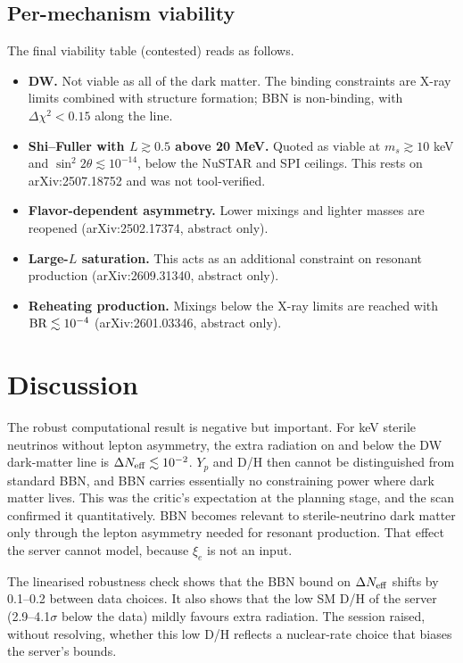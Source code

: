 \documentclass[11pt,a4paper]{article}
\begin{document}
\subsection{Per-mechanism viability}
The final viability table (contested) reads as follows.
\begin{itemize}
\item \textbf{DW.} Not viable as all of the dark matter. The binding constraints are X-ray limits combined with structure formation; BBN is non-binding, with $\Delta\chi^2<0.15$ along the line.
\item \textbf{Shi--Fuller with $L\gtrsim0.5$ above 20 MeV.} Quoted as viable at $m_s\gtrsim10$ keV and $\sin^2 2\theta\lesssim10^{-14}$, below the NuSTAR and SPI ceilings. This rests on arXiv:2507.18752 and was not tool-verified.
\item \textbf{Flavor-dependent asymmetry.} Lower mixings and lighter masses are reopened (arXiv:2502.17374, abstract only).
\item \textbf{Large-$L$ saturation.} This acts as an additional constraint on resonant production (arXiv:2609.31340, abstract only).
\item \textbf{Reheating production.} Mixings below the X-ray limits are reached with ${\rm BR}\lesssim10^{-4}$ (arXiv:2601.03346, abstract only).
\end{itemize}

\section{Discussion}
The robust computational result is negative but important. For keV sterile neutrinos without lepton asymmetry, the extra radiation on and below the DW dark-matter line is $\Delta N_{\rm eff}\lesssim10^{-2}$. $Y_p$ and D/H then cannot be distinguished from standard BBN, and BBN carries essentially no constraining power where dark matter lives. This was the critic's expectation at the planning stage, and the scan confirmed it quantitatively. BBN becomes relevant to sterile-neutrino dark matter only through the lepton asymmetry needed for resonant production. That effect the server cannot model, because $\xi_e$ is not an input.

The linearised robustness check shows that the BBN bound on $\Delta N_{\rm eff}$ shifts by 0.1--0.2 between data choices. It also shows that the low SM D/H of the server (2.9--4.1$\sigma$ below the data) mildly favours extra radiation. The session raised, without resolving, whether this low D/H reflects a nuclear-rate choice that biases the server's bounds.
\end{document}
